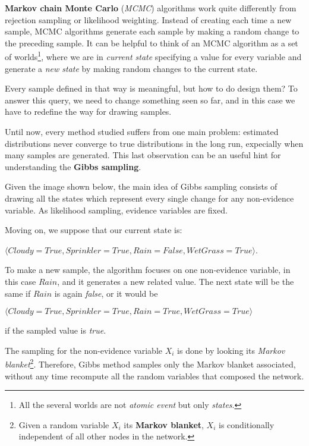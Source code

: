 \textbf{Markov chain Monte Carlo} (\textit{MCMC}) algorithms work quite differently from rejection sampling or likelihood weighting. Instead of creating each time a 
new sample, MCMC algorithms generate each sample by making a random change to the preceding sample. It can be helpful to think of an MCMC algorithm as a set of worlds\footnote{All the several worlds are not \textit{atomic event} but only \textit{states}.},
where we are in \textit{current state} specifying a value for every variable and generate a \textit{new state} by making random changes to the current state. \vspace{3.5pt}

Every sample defined in that way is meaningful, but how to do design them? To answer this query, we need to change something seen so far, and in this case we have to redefine
the way for drawing samples. \vspace{3.5pt}

Until now, every method studied suffers from one main problem: estimated distributions never converge to true distributions in the long run, expecially when many samples 
are generated. This last observation can be an useful hint for understanding the \textbf{Gibbs sampling}. \vspace{3.5pt}

Given the image shown below, the main idea of Gibbs sampling consists of drawing all the states which represent every single change for any non-evidence variable. As likelihood
sampling, evidence variables are fixed. \vspace{3.5pt}

Moving on, we suppose that our current state is:
\begin{center} \vspace{3.5pt}
    $\langle Cloudy=True, Sprinkler=True, Rain=False, WetGrass=True \rangle$.
\end{center} \vspace{3.5pt}
To make a new sample, the algorithm focuses on one non-evidence variable, in this case $Rain$, and it generates a new related value. The next state will be the same if $Rain$
is again \textit{false}, or it would be 
\begin{center} \vspace{3.5pt}
    $\langle Cloudy=True, Sprinkler=True, Rain=True, WetGrass=True \rangle$
\end{center} \vspace{3.5pt}
if the sampled value is \textit{true}. 
\begin{center}
\end{center} \vspace{3.5pt}
The sampling for the non-evidence variable $X_i$ is done by looking its \textit{Markov blanket}\footnote{Given a random variable $X_i$ its \textbf{Markov blanket}, $X_i$ is conditionally independent of all other nodes in the network.}.
Therefore, Gibbs method samples only the Markov blanket associated, without any time recompute all the random variables that composed the network.

